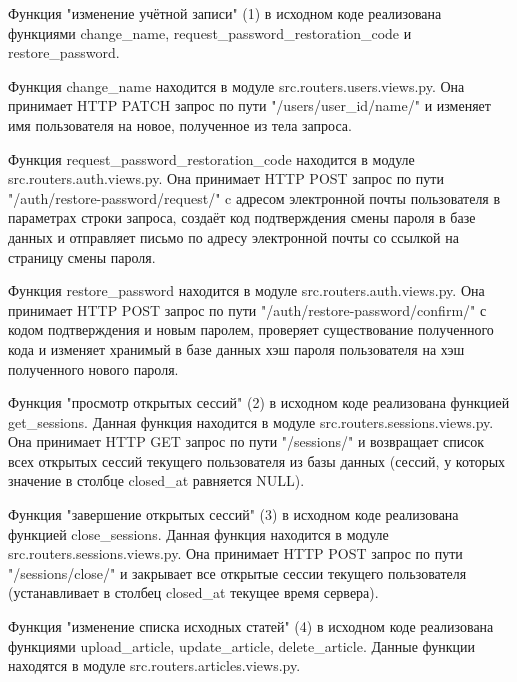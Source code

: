 
Функция "изменение учётной записи" (1) в исходном коде реализована функциями change\_name, request\_password\_restoration\_code и restore\_password.

Функция change\_name находится в модуле src.routers.users.views.py. Она принимает HTTP PATCH запрос по пути "/users/{user\_id}/name/" и изменяет имя пользователя на новое, полученное из тела запроса.

    Функция request\_password\_restoration\_code находится в модуле src.routers.auth.views.py. Она принимает HTTP POST запрос по пути "/auth/restore-password/request/" c адресом электронной почты пользователя в параметрах строки запроса, создаёт код подтверждения смены пароля в базе данных и отправляет письмо по адресу электронной почты со ссылкой на страницу смены пароля.

Функция restore\_password находится в модуле src.routers.auth.views.py. Она принимает HTTP POST запрос по пути "/auth/restore-password/confirm/" с кодом подтверждения и новым паролем, проверяет существование полученного кода и изменяет хранимый в базе данных хэш пароля пользователя на хэш полученного нового пароля.


Функция "просмотр открытых сессий" (2) в исходном коде реализована функцией get\_sessions. Данная функция находится в модуле src.routers.sessions.views.py. Она принимает HTTP GET запрос по пути "/sessions/" и возвращает список всех открытых сессий текущего пользователя из базы данных (сессий, у которых значение в столбце closed\_at равняется NULL).


Функция "завершение открытых сессий" (3) в исходном коде реализована функцией close\_sessions. Данная функция находится в модуле src.routers.sessions.views.py. Она принимает HTTP POST запрос по пути "/sessions/close/" и закрывает все открытые сессии текущего пользователя (устанавливает в столбец closed\_at текущее время сервера).


Функция "изменение списка исходных статей" (4) в исходном коде реализована функциями upload\_article, update\_article, delete\_article. Данные функции находятся в модуле src.routers.articles.views.py.


